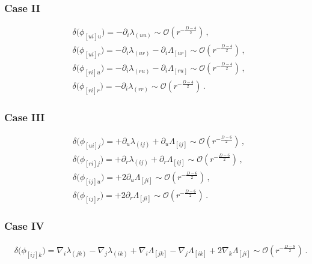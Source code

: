 \documentclass[a4paper,12pt]{article}
\begin{document}
\subsubsection*{Case II}
\begin{equation}
\begin{aligned}
&\delta\!\bigl(\phi_{[u i]u}\bigr)
= - \partial_i \lambda_{(u u)} 
\sim \mathcal{O}\!\left(r^{-\frac{D-4}{2}}\right) \, , \\
&\delta\!\bigl(\phi_{[u i]r}\bigr)
=  - \partial_i \lambda_{(u r)} - \partial_i \Lambda_{[u r]}
\sim \mathcal{O}\!\left(r^{-\frac{D-4}{2}}\right) \, , \\
&\delta\!\bigl(\phi_{[r i]u}\bigr)
=- \partial_i \lambda_{(r u)} - \partial_i \Lambda_{[r u]}
\sim \mathcal{O}\!\left(r^{-\frac{D-4}{2}}\right) \, , \\
&\delta\!\bigl(\phi_{[r i]r}\bigr)
= - \partial_i \lambda_{(r r)} 
\sim \mathcal{O}\!\left(r^{-\frac{D-4}{2}}\right) \, .
\end{aligned}
\end{equation}

\subsubsection*{Case III}
\begin{equation}
\begin{aligned}
&\delta\!\bigl(\phi_{[u i]j}\bigr)
= + \partial_u \lambda_{(i j)}
  + \partial_u \Lambda_{[i j]}
\sim \mathcal{O}\!\left(r^{-\frac{D-6}{2}}\right) \, , \\
&\delta\!\bigl(\phi_{[r i]j}\bigr)
= + \partial_r \lambda_{(i j)}
  + \partial_r \Lambda_{[i j]}
\sim \mathcal{O}\!\left(r^{-\frac{D-6}{2}}\right) \, , \\
&\delta\!\bigl(\phi_{[i j]u}\bigr)
=  + 2 \partial_u \Lambda_{[j i]}
\sim \mathcal{O}\!\left(r^{-\frac{D-6}{2}}\right) \, , \\
&\delta\!\bigl(\phi_{[i j]r}\bigr)
=
  + 2 \partial_r \Lambda_{[j i]}
\sim \mathcal{O}\!\left(r^{-\frac{D-6}{2}}\right) \, .
\end{aligned}
\end{equation}


\subsubsection*{Case IV}
\begin{equation}
\begin{aligned}
&\delta\!\bigl(\phi_{[i j]k}\bigr)
= \nabla_i \lambda_{(j k)} - \nabla_j \lambda_{(i k)}
  + \nabla_i \Lambda_{[j k]} - \nabla_j \Lambda_{[i k]}
  + 2 \nabla_k \Lambda_{[j i]}
\sim \mathcal{O}\!\left(r^{-\frac{D-8}{2}}\right) \, .
\end{aligned}
\end{equation}
\end{document}
